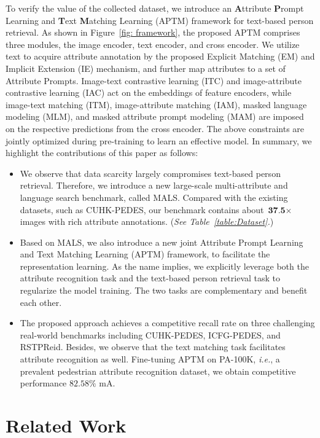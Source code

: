 \documentclass[sigconf]{acmart}
\def\ie{\emph{i.e.}}
\begin{document}
To verify the value of the collected dataset, 
we introduce an \textbf{A}ttribute \textbf{P}rompt Learning and \textbf{T}ext \textbf{M}atching Learning (APTM) framework for text-based person retrieval. 
As shown in Figure~\ref{fig: framework}, the proposed APTM comprises three modules, the image encoder, text encoder, and cross encoder. 
We utilize text to acquire attribute annotation by the proposed Explicit Matching (EM) and Implicit Extension (IE) mechanism, and further map attributes to a set of Attribute Prompts. 
Image-text contrastive learning (ITC) and image-attribute contrastive learning (IAC) act on the embeddings of feature encoders, while image-text matching (ITM), image-attribute matching (IAM), masked language modeling (MLM), and masked attribute prompt modeling (MAM) are imposed on the respective predictions from the cross encoder. 
The above constraints are jointly optimized during pre-training to learn an effective model.
In summary, we highlight the contributions of this paper as follows:
\begin{itemize}[leftmargin=*]
    \item We observe that data scarcity largely compromises text-based person retrieval. Therefore, we introduce a new large-scale multi-attribute and language search benchmark, called MALS. Compared with the existing datasets, such as CUHK-PEDES, our benchmark contains about $\textbf{37.5}\times$ images with rich attribute annotations.
    (\emph{See Table~\ref{table:Dataset}.})
    
    \item Based on MALS, we also introduce a new joint Attribute Prompt Learning and Text Matching Learning (APTM) framework, to facilitate the representation learning.
    As the name implies, we explicitly leverage both the attribute recognition task and the text-based person retrieval task to regularize the model training. The two tasks are complementary and benefit each other.
    
    \item The proposed approach achieves a competitive recall rate on three challenging real-world benchmarks including CUHK-PEDES, ICFG-PEDES, and RSTPReid. 
    Besides, we observe that the text matching task facilitates attribute recognition as well.
    Fine-tuning APTM on PA-100K, \ie, a prevalent pedestrian attribute recognition dataset, we obtain competitive performance $82.58 \%$ mA. 
\end{itemize}


\section{Related Work}
\end{document}
